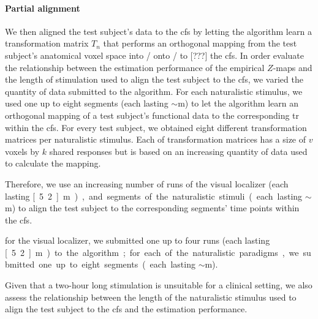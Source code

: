 \paragraph{Partial alignment}






We then aligned the test subject's data to the \ac{cfs} by letting the algorithm
learn a transformation matrix $T_{n}$ that performs an orthogonal mapping from
the test subject's anatomical voxel space into / onto / to [???] the \ac{cfs}.
In order evaluate the relationship between the estimation performance of the
empirical $Z$-maps and the length of stimulation used to align the test subject
to the \ac{cfs}, we varied the quantity of data submitted to the algorithm.
%
For each naturalistic stimulus, we used one up to eight segments (each lasting
$\sim$\unit[15]{m}) to let the algorithm learn an orthogonal mapping of a test
subject's functional data to the corresponding \acs{tr} within the \ac{cfs}.
%
For every test subject, we obtained eight different transformation matrices per
naturalistic stimulus.
%
Each of transformation matrices has a size of $v$ voxels by $k$ shared responses
but is based on an increasing quantity of data used to calculate the mapping.


%
Therefore, we use an increasing number of runs of the visual localizer (each
lasting \unit[5.2]{m}), and segments of the naturalistic stimuli (each lasting
$\sim$\unit[15]{m}) to align the test subject to the corresponding segments'
time points within the \ac{cfs}.

%
for the visual localizer, we submitted one up to four runs (each lasting
\unit[5.2]{m}) to the algorithm;
%
for each of the naturalistic paradigms, we submitted one up to eight segments
(each lasting $\sim$\unit[15]{m}).

%
Given that a two-hour long stimulation is unsuitable for a clinical setting, we
also assess the relationship between the length of the naturalistic stimulus
used to align the test subject to the \ac{cfs} and the estimation performance.

